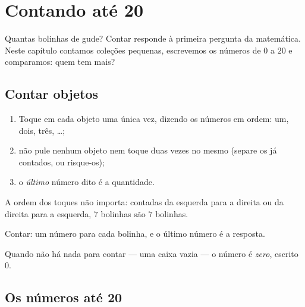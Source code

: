 \chapter{Contando até 20}\label{ch:g1:counting}

Quantas bolinhas de gude? Contar responde à primeira pergunta da
matemática. Neste capítulo contamos coleções pequenas, escrevemos os
números de $0$ a $20$ e comparamos: quem tem mais?

\section{Contar objetos}

\begin{method}\label{met:g1:counting:how}
\begin{enumerate}
  \item Toque em cada objeto uma única vez, dizendo os números em
        ordem: um, dois, três, \dots;
  \item não pule nenhum objeto nem toque duas vezes no mesmo (separe
        os já contados, ou risque-os);
  \item o \emph{último} número dito é a quantidade.
\end{enumerate}
A ordem dos toques não importa: contadas da esquerda para a direita
ou da direita para a esquerda, $7$ bolinhas são $7$ bolinhas.
\end{method}

\begin{omfigure}

{\small Contar: um número para cada bolinha, e o último número é a
resposta.}
\end{omfigure}

\begin{definition}[Zero]\label{def:g1:counting:zero}
Quando não há nada para contar --- uma caixa vazia --- o número é
\emph{zero}, escrito $0$.
\end{definition}

\section{Os números até 20}

